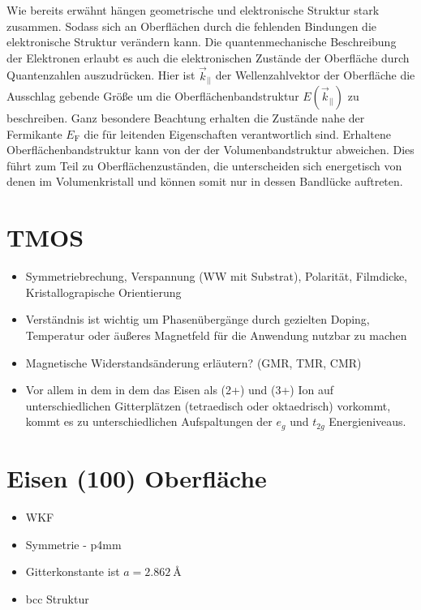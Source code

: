         Wie bereits erwähnt hängen geometrische und elektronische Struktur stark zusammen.
        Sodass sich an Oberflächen durch die fehlenden Bindungen die elektronische Struktur verändern kann.
        Die quantenmechanische Beschreibung der Elektronen erlaubt es auch die elektronischen Zustände der Oberfläche durch Quantenzahlen auszudrücken.
        Hier ist $\vec{k}_{||}$ der Wellenzahlvektor der Oberfläche die Ausschlag gebende Größe um die Oberflächenbandstruktur $E(\vec{k}_{||})$ zu beschreiben.
        Ganz besondere Beachtung erhalten die Zustände nahe der Fermikante $E_\text{F}$ die für leitenden Eigenschaften verantwortlich sind.
        Erhaltene Oberflächenbandstruktur kann von der der Volumenbandstruktur abweichen.
        Dies führt zum Teil zu Oberflächenzuständen, die unterscheiden sich energetisch von denen im Volumenkristall und können somit nur in dessen Bandlücke auftreten.
    

    \section{TMOS}    
    \begin{itemize}
        \item Symmetriebrechung, Verspannung (WW mit Substrat), Polarität, Filmdicke, Kristallograpische Orientierung
        \item Verständnis ist wichtig um Phasenübergänge durch gezielten Doping, Temperatur oder äußeres Magnetfeld für die Anwendung nutzbar zu machen
        \item Magnetische Widerstandsänderung erläutern? (GMR, TMR, CMR)
        \item Vor allem in dem  in dem das Eisen als (2+) und (3+) Ion auf unterschiedlichen Gitterplätzen (tetraedisch oder oktaedrisch) vorkommt, kommt es zu unterschiedlichen Aufspaltungen der $e_g$ und $t_{2g}$ Energieniveaus.
    \end{itemize}

    \section{Eisen (100) Oberfläche}
        \begin{itemize}
            \item WKF
            \item Symmetrie - p4mm
            \item Gitterkonstante ist $a = \SI{2.862}{\angstrom}$~\cite{springer_database}
            \item bcc Struktur
        \end{itemize}
    
